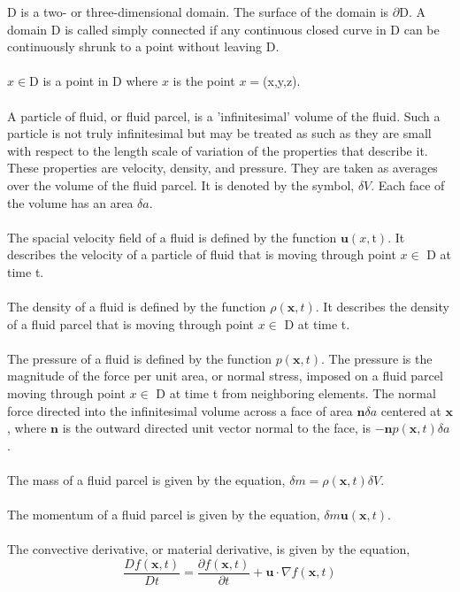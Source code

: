 \documentclass[12pt]{article}
\begin{document}
\begin{flushleft}
D is a two- or three-dimensional domain. The surface of the domain is $\partial$D. A domain D is called simply connected if 
any continuous closed curve in D can be continuously shrunk to a point without 
leaving D. 
\\~\\
$x\in$D is a point in D where $x$ is the point $x=$(x,y,z).
\\~\\
A particle of fluid, or fluid parcel, is a 'infinitesimal' volume of the fluid. Such a particle is not truly infinitesimal but may be treated as such as they are small with respect to the length scale of variation of the properties that describe it. These properties are velocity, density, and pressure. They are taken as averages over the volume of the fluid parcel. It is denoted by the symbol, $\delta V$. Each face of the volume has an area $\delta a$.
\\~\\
The spacial velocity field of a fluid is defined by the function $\textbf{u}(x,\text{t})$. It describes the velocity of a particle of fluid that is moving through point $x\in$ D at time t.
\\~\\
The density of a fluid is defined by the function $\rho(\textbf{x},t)$. It describes the density of a fluid parcel that is moving through point $x\in$ D at time t.
\\~\\
The pressure of a fluid is defined by the function $p(\textbf{x},t)$. The pressure is the magnitude of the force per unit area, or normal stress, imposed on
a fluid parcel moving through point $x\in$ D at time t from neighboring elements. The normal force directed into the infinitesimal volume across a face of area $\textbf{n}\delta a$ centered at $\textbf{x}$, where $\textbf{n}$ is the outward
directed unit vector normal to the face, is $-\textbf{n}p(\textbf{x}, t)\delta a$. 
\\~\\
The mass of a fluid parcel is given by the equation, $\delta m = \rho(\textbf{x},t)\delta V$.
\\~\\
The momentum of a fluid parcel is given by the equation, $\delta m \textbf{u}(\textbf{x},t)$.
\\~\\
The convective derivative, or material derivative, is given by the equation,
$$\frac{Df(\textbf{x},t)}{Dt} = \frac{\partial f(\textbf{x},t)}{\partial t} + \textbf{u}\cdot \nabla f(\textbf{x},t)$$

\end{flushleft}
\end{document}
